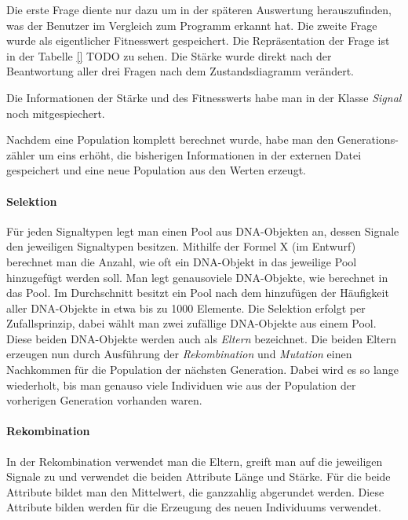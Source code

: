 Die erste Frage diente nur dazu um in der sp{\"a}teren Auswertung herauszufinden, was der Benutzer im Vergleich zum Programm erkannt hat. 
Die zweite Frage wurde als eigentlicher Fitnesswert gespeichert. Die Repr{\"a}sentation der Frage ist in der Tabelle \autoref{} TODO zu sehen.
Die St{\"a}rke wurde direkt nach der Beantwortung aller drei Fragen nach dem Zustandsdiagramm ver{\"a}ndert.

Die Informationen der St{\"a}rke und des Fitnesswerts habe man in der Klasse \textit{Signal} noch mitgespiechert.

Nachdem eine Population komplett berechnet wurde, habe man den Generations-z{\"a}hler um eins erh{\"o}ht, die bisherigen Informationen in der externen Datei gespeichert und eine neue Population aus den Werten erzeugt.

\paragraph{Selektion}
F{\"u}r jeden Signaltypen legt man einen Pool aus DNA-Objekten an, dessen Signale den jeweiligen Signaltypen besitzen.
Mithilfe der Formel X (im Entwurf) berechnet man die Anzahl, wie oft ein DNA-Objekt in das jeweilige Pool hinzugef{\"u}gt werden soll. Man legt genausoviele DNA-Objekte, wie berechnet in das Pool. 
Im Durchschnitt besitzt ein Pool nach dem hinzuf{\"u}gen der H{\"a}ufigkeit aller DNA-Objekte in etwa bis zu 1000 Elemente.
Die Selektion erfolgt per Zufallsprinzip, dabei w{\"a}hlt man zwei zuf{\"a}llige DNA-Objekte aus einem Pool. Diese beiden DNA-Objekte werden auch als \textit{Eltern} bezeichnet. Die beiden Eltern erzeugen nun durch Ausf{\"u}hrung der \textit{Rekombination} und \textit{Mutation} einen Nachkommen f{\"u}r die Population der n{\"a}chsten Generation. Dabei wird es so lange wiederholt, bis man genauso viele Individuen wie aus der Population der vorherigen Generation vorhanden waren.

\paragraph{Rekombination}
In der Rekombination verwendet man die Eltern, greift man auf die jeweiligen Signale zu und verwendet die beiden Attribute L{\"a}nge und St{\"a}rke. 
F{\"u}r die beide Attribute bildet man den Mittelwert, die ganzzahlig abgerundet werden.
Diese Attribute bilden werden f{\"u}r die Erzeugung des neuen Individuums verwendet.

